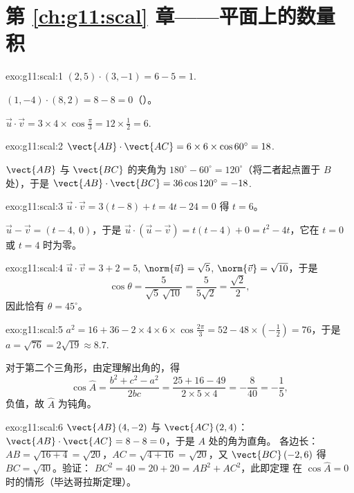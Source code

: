 \section*{第 \ref{ch:g11:scal} 章——平面上的数量积}

\begin{solution}{exo:g11:scal:1}
$(2,5)\cdot(3,-1) = 6 - 5 = 1$.

$(1,-4)\cdot(8,2) = 8 - 8 = 0$（）。

$\vec u\cdot\vec v = 3 \times 4 \times \cos\frac\pi3 = 12 \times \frac12
= 6$.
\end{solution}

\begin{solution}{exo:g11:scal:2}
$\vect{AB}\cdot\vect{AC} = 6 \times 6 \times \cos 60^\circ = 18$.

 $\vect{AB}$ 与 $\vect{BC}$ 的夹角为
$180^\circ - 60^\circ = 120^\circ$（将二者起点置于 $B$ 处），于是
$\vect{AB}\cdot\vect{BC} = 36 \cos 120^\circ = -18$.
\end{solution}

\begin{solution}{exo:g11:scal:3}
$\vec u \cdot \vec v = 3(t - 8) + t = 4t - 24 = 0$ 得 $t = 6$。

$\vec u - \vec v = (t - 4,\ 0)$，于是
$\vec u \cdot (\vec u - \vec v) = t(t-4) + 0 = t^2 - 4t$，它在
$t = 0$ 或 $t = 4$ 时为零。
\end{solution}

\begin{solution}{exo:g11:scal:4}
$\vec u \cdot \vec v = 3 + 2 = 5$, $\norm{\vec u} = \sqrt5$,
$\norm{\vec v} = \sqrt{10}$，于是
\[
\cos\theta = \frac{5}{\sqrt5\,\sqrt{10}} = \frac{5}{5\sqrt2}
= \frac{\sqrt2}{2},
\]
因此恰有 $\theta = 45^\circ$。
\end{solution}

\begin{solution}{exo:g11:scal:5}
$a^2 = 16 + 36 - 2 \times 4 \times 6 \times \cos\frac{2\pi}{3}
= 52 - 48 \times \left(-\frac12\right) = 76$，于是 $a = \sqrt{76} =
2\sqrt{19} \approx 8.7$.

对于第二个三角形，由定理解出角的，得
\[
\cos\widehat A = \frac{b^2 + c^2 - a^2}{2bc}
= \frac{25 + 16 - 49}{2 \times 5 \times 4} = -\frac{8}{40} = -\frac15,
\]
负值，故 $\widehat A$ 为钝角。
\end{solution}

\begin{solution}{exo:g11:scal:6}
$\vect{AB}\,(4, -2)$ 与 $\vect{AC}\,(2, 4)$：
$\vect{AB}\cdot\vect{AC} = 8 - 8 = 0$，于是 $A$ 处的角为直角。
各边长：$AB = \sqrt{16 + 4} = \sqrt{20}$，$AC = \sqrt{4 + 16} =
\sqrt{20}$，又 $\vect{BC}\,(-2, 6)$ 得 $BC = \sqrt{40}$。验证：
$BC^2 = 40 = 20 + 20 = AB^2 + AC^2$，此即定理
在 $\cos\widehat A = 0$ 时的情形（毕达哥拉斯定理）。
\end{solution}

